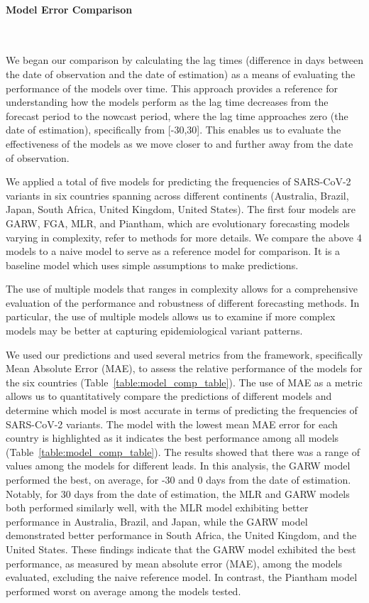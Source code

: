 \documentclass[11pt,oneside,letterpaper]{article}
\begin{document}
\paragraph{Model Error Comparison}\

We began our comparison by calculating the lag times (difference in days between the date of observation and the date of estimation) as a means of evaluating the performance of the models over time.
This approach provides a reference for understanding how the models perform as the lag time decreases from the forecast period to the nowcast period, where the lag time approaches zero (the date of estimation), specifically from [-30,30].
This enables us to evaluate the effectiveness of the models as we move closer to and further away from the date of observation.

We applied a total of five models for predicting the frequencies of SARS-CoV-2 variants in six countries spanning across different continents (Australia, Brazil, Japan, South Africa, United Kingdom, United States).
The first four models are GARW, FGA, MLR, and Piantham, which are evolutionary forecasting models varying in complexity, refer to methods for more details. 
We compare the above 4 models to a naive model to serve as a reference model for comparison.
It is a baseline model which uses simple assumptions to make predictions. %

The use of multiple models that ranges in complexity allows for a comprehensive evaluation of the performance and robustness of different forecasting methods.
In particular, the use of multiple models allows us to examine if more complex models may be better at capturing epidemiological variant patterns. 

We used our predictions and used several metrics from the framework, specifically Mean Absolute Error (MAE), to assess the relative performance of the models for the six countries (Table~\ref{table:model_comp_table}).
The use of MAE as a metric allows us to quantitatively compare the predictions of different models and determine which model is most accurate in terms of predicting the frequencies of SARS-CoV-2 variants.
The model with the lowest mean MAE error for each country is highlighted as it indicates the best performance among all models (Table~\ref{table:model_comp_table}). 
The results showed that there was a range of values among the models for different leads.
In this analysis, the GARW model performed the best, on average, for -30 and 0 days from the date of estimation.
Notably, for 30 days from the date of estimation, the MLR and GARW models both performed similarly well, with the MLR model exhibiting better performance in Australia, Brazil, and Japan, while the GARW model demonstrated better performance in South Africa, the United Kingdom, and the United States.
These findings indicate that the GARW model exhibited the best performance, as measured by mean absolute error (MAE), among the models evaluated, excluding the naive reference model.
In contrast, the Piantham model performed worst on average among the models tested.
\end{document}

